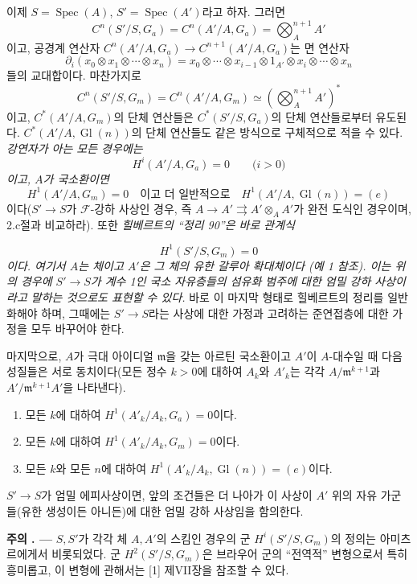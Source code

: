 \documentclass[11pt,twoside,openany]{book}
\numberwithin{equation}{section}
\newcommand{\sourceunit}{front}
\newcommand{\src}[1]{%
  \phantomsection\hypertarget{src:\sourceunit:#1}{}%
  \marginpar{\raggedleft\footnotesize\sffamily #1}%
}
\theoremstyle{plain}
\theoremstyle{definition}
\theoremstyle{remark}
\newcommand{\result}[2]{%
  \par\medskip\noindent\textbf{#1%
  \if\relax\detokenize{#2}\relax\else\space#2\fi. ---}\enspace
}
\begin{document}
이제 $S=\operatorname{Spec}(A)$,
$S'=\operatorname{Spec}(A')$라고 하자. 그러면
\[
  C^n(S'/S,G_a)=C^n(A'/A,G_a)=\bigotimes_A^{n+1}A'
\]
이고, 공경계 연산자
$C^n(A'/A,G_a)\longrightarrow C^{n+1}(A'/A,G_a)$는 면 연산자
\[
  \partial_i(x_0\otimes x_1\otimes\cdots\otimes x_n)
  =x_0\otimes\cdots\otimes x_{i-1}\otimes1_{A'}\otimes
   x_i\otimes\cdots\otimes x_n
\]
들의 교대합이다. 마찬가지로
\[
  C^n(S'/S,G_m)=C^n(A'/A,G_m)
  \simeq\left(\bigotimes_A^{n+1}A'\right)^*
\]
이고, $C^*(A'/A,G_m)$의 단체 연산들은
$C^*(S'/S,G_a)$의 단체 연산들로부터 유도된다.
\linebreak $C^*(A'/A,\operatorname{Gl}(n))$의 단체 연산들도 같은 방식으로
구체적으로 적을 수 있다. \emph{강연자가 아는 모든 경우에는}
\[
  H^i(A'/A,G_a)=0\qquad\text{($i>0$)}
\]
\emph{이고, $A$가 국소환이면}
\[
  H^1(A'/A,G_m)=0
  \quad\text{이고 더 일반적으로}\quad
  H^1(A'/A,\operatorname{Gl}(n))=(e)
\]
이다($S'\longrightarrow S$가 $\mathcal F$-강하 사상인 경우, 즉
$A\longrightarrow A'\rightrightarrows A'\otimes_AA'$가 완전 도식인
경우이며, 2.c절과 비교하라). 또한 \emph{힐베르트의 “정리 90”은 바로
관계식}
\src{314}
\[
  H^1(S'/S,G_m)=0
\]
\emph{이다. 여기서 $A$는 체이고 $A'$은 그 체의 유한 갈루아 확대체이다
(예 1 참조). 이는 위의 경우에 $S'\longrightarrow S$가 계수 1인
국소 자유층들의 섬유화 범주에 대한 엄밀 강하 사상이라고 말하는 것으로도
표현할 수 있다.} 바로 이 마지막 형태로 힐베르트의 정리를 일반화해야 하며,
그때에는 $S'\longrightarrow S$라는 사상에 대한 가정과 고려하는
준연접층에 대한 가정을 모두 바꾸어야 한다.

마지막으로, $A$가 극대 아이디얼 $\mathfrak m$을 갖는 아르틴 국소환이고
$A'$이 $A$-대수일 때 다음 성질들은 서로 동치이다(모든 정수 $k>0$에
대하여 $A_k$와 $A'_k$는 각각
$A/\mathfrak m^{k+1}$과 $A'/\mathfrak m^{k+1}A'$을 나타낸다).
\begin{enumerate}
\item[(i)] 모든 $k$에 대하여 $H^1(A'_k/A_k,G_a)=0$이다.
\item[(ii)] 모든 $k$에 대하여 $H^1(A'_k/A_k,G_m)=0$이다.
\item[(iii)] 모든 $k$와 모든 $n$에 대하여
$H^1(A'_k/A_k,\operatorname{Gl}(n))=(e)$이다.
\end{enumerate}
$S'\longrightarrow S$가 엄밀 에피사상이면, 앞의 조건들은 더 나아가 이
사상이 $A'$ 위의 자유 가군들(유한 생성이든 아니든)에 대한 엄밀 강하
사상임을 함의한다.

\result{주의}{} $S,S'$가 각각 체 $A,A'$의 스킴인 경우의 군
$H^i(S'/S,G_m)$의 정의는 아미츠르에게서 비롯되었다. 군
$H^2(S'/S,G_m)$은 브라우어 군의 “전역적” 변형으로서 특히 흥미롭고,
이 변형에 관해서는 [1] 제VII장을 참조할 수 있다.
\end{document}
